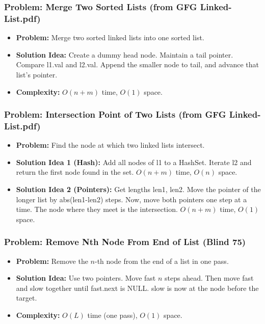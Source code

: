 \subsubsection{Problem: Merge Two Sorted Lists (from GFG Linked-List.pdf)}
\begin{itemize}
\item \textbf{Problem:} Merge two sorted linked lists into one sorted list.
\item \textbf{Solution Idea:} Create a dummy head node. Maintain a tail pointer. Compare l1.val and l2.val. Append the smaller node to tail, and advance that list's pointer.
\item \textbf{Complexity:} $O(n+m)$ time, $O(1)$ space.
\end{itemize}

\subsubsection{Problem: Intersection Point of Two Lists (from GFG Linked-List.pdf)}
\begin{itemize}
\item \textbf{Problem:} Find the node at which two linked lists intersect.
\item \textbf{Solution Idea 1 (Hash):} Add all nodes of l1 to a HashSet. Iterate l2 and return the first node found in the set. $O(n+m)$ time, $O(n)$ space.
\item \textbf{Solution Idea 2 (Pointers):} Get lengths len1, len2. Move the pointer of the longer list by abs(len1-len2) steps. Now, move both pointers one step at a time. The node where they meet is the intersection. $O(n+m)$ time, $O(1)$ space.
\end{itemize}

\subsubsection{Problem: Remove Nth Node From End of List (Blind 75)}
\begin{itemize}
\item \textbf{Problem:} Remove the $n$-th node from the end of a list in one pass.
\item \textbf{Solution Idea:} Use two pointers. Move fast $n$ steps ahead. Then move fast and slow together until fast.next is NULL. slow is now at the node before the target.
\item \textbf{Complexity:} $O(L)$ time (one pass), $O(1)$ space.
\end{itemize}

